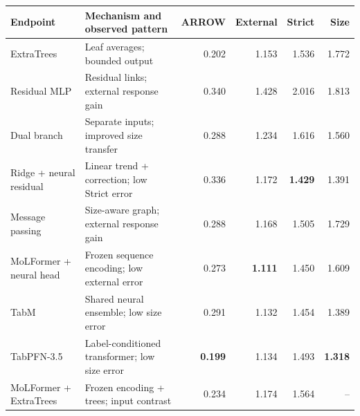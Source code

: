 \begin{tabular}{@{}>{\raggedright\arraybackslash}p{3.85cm}>{\raggedright\arraybackslash}p{5.25cm}rrrr@{}}
\toprule
Endpoint & Mechanism and observed pattern & ARROW & External & Strict & Size \\
\midrule

ExtraTrees & Leaf averages; bounded output & 0.202 & 1.153 & 1.536 & 1.772 \\
Residual MLP & Residual links; external response gain & 0.340 & 1.428 & 2.016 & 1.813 \\
Dual branch & Separate inputs; improved size transfer & 0.288 & 1.234 & 1.616 & 1.560 \\
Ridge + neural residual & Linear trend + correction; low Strict error & 0.336 & 1.172 & \textbf{1.429} & 1.391 \\
Message passing & Size-aware graph; external response gain & 0.288 & 1.168 & 1.505 & 1.729 \\
MoLFormer + neural head & Frozen sequence encoding; low external error & 0.273 & \textbf{1.111} & 1.450 & 1.609 \\
TabM & Shared neural ensemble; low size error & 0.291 & 1.132 & 1.454 & 1.389 \\
TabPFN-3.5 & Label-conditioned transformer; low size error & \textbf{0.199} & 1.134 & 1.493 & \textbf{1.318} \\
MoLFormer + ExtraTrees & Frozen encoding + trees; input contrast & 0.234 & 1.174 & 1.564 & -- \\
\bottomrule\end{tabular}

